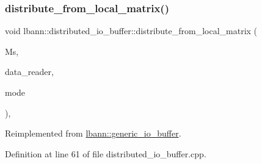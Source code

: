 \subsubsection{\texorpdfstring{distribute\+\_\+from\+\_\+local\+\_\+matrix()}{distribute\_from\_local\_matrix()}}
{\footnotesize\ttfamily void lbann\+::distributed\+\_\+io\+\_\+buffer\+::distribute\+\_\+from\+\_\+local\+\_\+matrix (\begin{DoxyParamCaption}\item[{\hyperlink{base_8hpp_a9a697a504ae84010e7439ffec862b470}{Abs\+Dist\+Mat} \&}]{Ms,  }\item[{\hyperlink{classlbann_1_1generic__data__reader}{generic\+\_\+data\+\_\+reader} $\ast$}]{data\+\_\+reader,  }\item[{\hyperlink{base_8hpp_a2781a159088df64ed7d47cc91c4dc0a8}{execution\+\_\+mode}}]{mode }\end{DoxyParamCaption})\hspace{0.3cm}{\ttfamily [override]}, {\ttfamily [virtual]}}



Reimplemented from \hyperlink{classlbann_1_1generic__io__buffer_a08c2bb93b86d2926df52ef9272a07d87}{lbann\+::generic\+\_\+io\+\_\+buffer}.



Definition at line 61 of file distributed\+\_\+io\+\_\+buffer.\+cpp.


